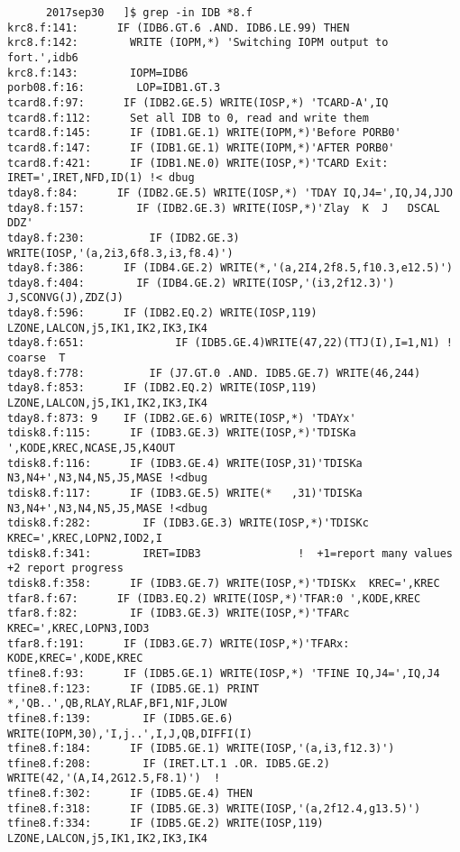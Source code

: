 \documentclass{article}
\begin{document}
\vspace{-3.mm} 
\begin{verbatim}
      2017sep30   ]$ grep -in IDB *8.f
krc8.f:141:      IF (IDB6.GT.6 .AND. IDB6.LE.99) THEN
krc8.f:142:        WRITE (IOPM,*) 'Switching IOPM output to  fort.',idb6
krc8.f:143:        IOPM=IDB6
porb08.f:16:        LOP=IDB1.GT.3
tcard8.f:97:      IF (IDB2.GE.5) WRITE(IOSP,*) 'TCARD-A',IQ
tcard8.f:112:      Set all IDB to 0, read and write them
tcard8.f:145:      IF (IDB1.GE.1) WRITE(IOPM,*)'Before PORB0'
tcard8.f:147:      IF (IDB1.GE.1) WRITE(IOPM,*)'AFTER PORB0'
tcard8.f:421:      IF (IDB1.NE.0) WRITE(IOSP,*)'TCARD Exit: IRET=',IRET,NFD,ID(1) !< dbug
tday8.f:84:      IF (IDB2.GE.5) WRITE(IOSP,*) 'TDAY IQ,J4=',IQ,J4,JJO
tday8.f:157:        IF (IDB2.GE.3) WRITE(IOSP,*)'Zlay  K  J   DSCAL     DDZ'
tday8.f:230:          IF (IDB2.GE.3) WRITE(IOSP,'(a,2i3,6f8.3,i3,f8.4)')  
tday8.f:386:      IF (IDB4.GE.2) WRITE(*,'(a,2I4,2f8.5,f10.3,e12.5)') 
tday8.f:404:        IF (IDB4.GE.2) WRITE(IOSP,'(i3,2f12.3)') J,SCONVG(J),ZDZ(J)
tday8.f:596:      IF (IDB2.EQ.2) WRITE(IOSP,119) LZONE,LALCON,j5,IK1,IK2,IK3,IK4
tday8.f:651:              IF (IDB5.GE.4)WRITE(47,22)(TTJ(I),I=1,N1) ! coarse  T
tday8.f:778:          IF (J7.GT.0 .AND. IDB5.GE.7) WRITE(46,244) 
tday8.f:853:      IF (IDB2.EQ.2) WRITE(IOSP,119) LZONE,LALCON,j5,IK1,IK2,IK3,IK4
tday8.f:873: 9    IF (IDB2.GE.6) WRITE(IOSP,*) 'TDAYx'
tdisk8.f:115:      IF (IDB3.GE.3) WRITE(IOSP,*)'TDISKa ',KODE,KREC,NCASE,J5,K4OUT
tdisk8.f:116:      IF (IDB3.GE.4) WRITE(IOSP,31)'TDISKa N3,N4+',N3,N4,N5,J5,MASE !<dbug
tdisk8.f:117:      IF (IDB3.GE.5) WRITE(*   ,31)'TDISKa N3,N4+',N3,N4,N5,J5,MASE !<dbug
tdisk8.f:282:        IF (IDB3.GE.3) WRITE(IOSP,*)'TDISKc KREC=',KREC,LOPN2,IOD2,I
tdisk8.f:341:        IRET=IDB3               !  +1=report many values   +2 report progress 
tdisk8.f:358:      IF (IDB3.GE.7) WRITE(IOSP,*)'TDISKx  KREC=',KREC
tfar8.f:67:      IF (IDB3.EQ.2) WRITE(IOSP,*)'TFAR:0 ',KODE,KREC
tfar8.f:82:        IF (IDB3.GE.3) WRITE(IOSP,*)'TFARc KREC=',KREC,LOPN3,IOD3
tfar8.f:191:      IF (IDB3.GE.7) WRITE(IOSP,*)'TFARx:  KODE,KREC=',KODE,KREC
tfine8.f:93:      IF (IDB5.GE.1) WRITE(IOSP,*) 'TFINE IQ,J4=',IQ,J4
tfine8.f:123:      IF (IDB5.GE.1) PRINT *,'QB..',QB,RLAY,RLAF,BF1,N1F,JLOW
tfine8.f:139:        IF (IDB5.GE.6) WRITE(IOPM,30),'I,j..',I,J,QB,DIFFI(I)
tfine8.f:184:      IF (IDB5.GE.1) WRITE(IOSP,'(a,i3,f12.3)') 
tfine8.f:208:        IF (IRET.LT.1 .OR. IDB5.GE.2) WRITE(42,'(A,I4,2G12.5,F8.1)')  !
tfine8.f:302:      IF (IDB5.GE.4) THEN
tfine8.f:318:      IF (IDB5.GE.3) WRITE(IOSP,'(a,2f12.4,g13.5)') 
tfine8.f:334:      IF (IDB5.GE.2) WRITE(IOSP,119) LZONE,LALCON,j5,IK1,IK2,IK3,IK4

\end{verbatim}
\end{document}
